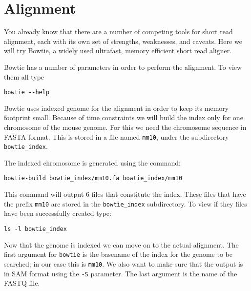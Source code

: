\section{Alignment}

\begin{information}
You already know that there are a number of competing tools for short read
alignment, each with its own set of strengths, weaknesses, and caveats. Here we
will try Bowtie, a widely used ultrafast, memory efficient short read
aligner.
\end{information}

\begin{steps}
Bowtie has a number of parameters in order to perform the alignment. To
view them all type

\begin{lstlisting}
bowtie --help
\end{lstlisting}

Bowtie uses indexed genome for the alignment in order to keep its memory
footprint small. Because of time constraints we will build the index only for
one chromosome of the mouse genome. For this we need the chromosome sequence in
FASTA format. This is stored in a file named \texttt{mm10}, under the
subdirectory \texttt{bowtie\_index}.

The indexed chromosome is generated using the command:

\begin{lstlisting}
bowtie-build bowtie_index/mm10.fa bowtie_index/mm10
\end{lstlisting}

This command will output 6 files that constitute the index. These files that
have the prefix \texttt{mm10} are stored in the \texttt{bowtie\_index}
subdirectory. To view if they files have been successfully created type:

\begin{lstlisting}
ls -l bowtie_index
\end{lstlisting}
\end{steps}

\begin{information}
Now that the genome is indexed we can move on to the actual alignment. The first
argument for \texttt{bowtie} is the basename of the index for the genome to be searched;
in our case this is \texttt{mm10}. We also want to make sure that the output is
in SAM format using the \texttt{-S} parameter. The last argument is the name of the
FASTQ file.
\end{information}


